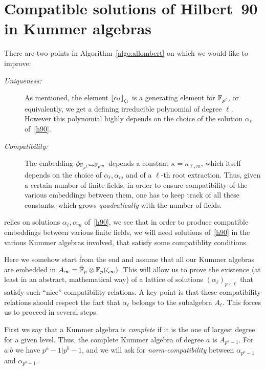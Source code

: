\documentclass{sig-alternate}
\begin{document}
\section{Compatible solutions of Hilbert~90 in Kummer algebras}
\label{sec:lattices}

There are two points in Algorithm~\ref{algo:allombert} on which we would like to improve:
\begin{description}
\item[\emph{Uniqueness:}] As mentioned, the element $\left\lfloor \alpha_{l} \right\rfloor_{\zeta_l}$ is a generating element for $\mathbb{F}_{p^{l}}$,
or equivalently, we get a defining irreducible polynomial of degree $\ell$.
However this polynomial highly depends on the choice of the solution $\alpha_{\ell}$ of~\eqref{h90}.
\item[\emph{Compatibility:}] The embedding $\phi_{\mathbb{F}_{p^{l}}\hookrightarrow\mathbb{F}_{p^{m}}}$ depends a constant $\kappa=\kappa_{\ell,m}$,
which itself depends on the choice of $\alpha_\ell,\alpha_m$ and of a $\ell$-th root extraction.
Thus, given a certain number of finite fields, in order to ensure compatibility of the various
embeddings between them, one has to keep track of all these constants, which grows \emph{quadratically}
with the number of fields.
\end{description}


relies on solutions $\alpha_\ell,\alpha_m$ of~\eqref{h90},
we see that in order to produce compatible embeddings between various finite fields,
we will need solutions of~\eqref{h90} in the various Kummer algebras involved,
that satisfy some compatiblity conditions.

Here we somehow start from the end and assume that all our Kummer algebras are
embedded in $A_\infty=\bar{\mathbb{F}}_{p}\otimes\mathbb{F}_p(\zeta_\infty)$.
This will allow us to prove the existence (at least in an abstract, mathematical way)
of a lattice of solutions $(\alpha_\ell)_{p{\nmid}\ell}$ that satisfy such ``nice''
compatibility relations. A key point is that these compatibility relations should respect
the fact that $\alpha_\ell$ belongs to the subalgebra $A_\ell$.
This forces us to proceed in several steps.

First we say that a Kummer algebra is \emph{complete} if it is the one of largest degree
for a given level. Thus, the complete Kummer algebra of degree $a$ is $A_{p^a-1}$.
For $a|b$ we have $p^a-1|p^b-1$, and we will ask for \emph{norm-compatibility}
between $\alpha_{p^a-1}$ and $\alpha_{p^b-1}$.
\end{document}
